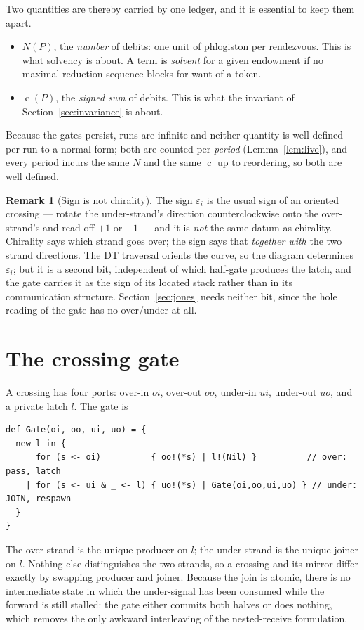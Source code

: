 \documentclass[11pt]{article}
\theoremstyle{definition}
\newtheorem{remark}{Remark}
\newcommand{\cost}{\operatorname{c}}
\begin{document}
Two quantities are thereby carried by one ledger, and it is essential to keep them
apart.
\begin{itemize}[nosep,leftmargin=1.6em]
\item $N(P)$, the \emph{number} of debits: one unit of phlogiston per rendezvous.
  This is what solvency is about. A term is \emph{solvent} for a given endowment
  if no maximal reduction sequence blocks for want of a token.
\item $\cost(P)$, the \emph{signed sum} of debits. This is what the invariant of
  Section~\ref{sec:invariance} is about.
\end{itemize}
Because the gates persist, runs are infinite and neither quantity is
well defined per run to a normal form; both are counted per \emph{period}
(Lemma~\ref{lem:live}), and every period incurs the same $N$ and the same
$\cost$ up to reordering, so both are well defined.

\begin{remark}[Sign is not chirality]\label{rem:sign}
The sign $\varepsilon_i$ is the usual sign of an oriented crossing --- rotate the
under-strand's direction counterclockwise onto the over-strand's and read off
$+1$ or $-1$ --- and it is \emph{not} the same datum as chirality. Chirality says
which strand goes over; the sign says that \emph{together with} the two strand
directions. The DT traversal orients the curve, so the diagram determines
$\varepsilon_i$; but it is a second bit, independent of which half-gate produces
the latch, and the gate carries it as the sign of its located stack rather than in
its communication structure. Section~\ref{sec:jones} needs neither bit, since the
hole reading of the gate has no over/under at all.
\end{remark}

\section{The crossing gate}\label{sec:gate}

A crossing has four ports: over-in $oi$, over-out $oo$, under-in $ui$, under-out
$uo$, and a private latch $l$. The gate is
\begin{lstlisting}
def Gate(oi, oo, ui, uo) = {
  new l in {
      for (s <- oi)          { oo!(*s) | l!(Nil) }          // over: pass, latch
    | for (s <- ui & _ <- l) { uo!(*s) | Gate(oi,oo,ui,uo) } // under: JOIN, respawn
  }
}
\end{lstlisting}
The over-strand is the unique producer on $l$; the under-strand is the unique
joiner on $l$. Nothing else distinguishes the two strands, so a crossing and its
mirror differ exactly by swapping producer and joiner. Because the join is atomic,
there is no intermediate state in which the under-signal has been consumed while
the forward is still stalled: the gate either commits both halves or does nothing,
which removes the only awkward interleaving of the nested-receive formulation.
\end{document}
